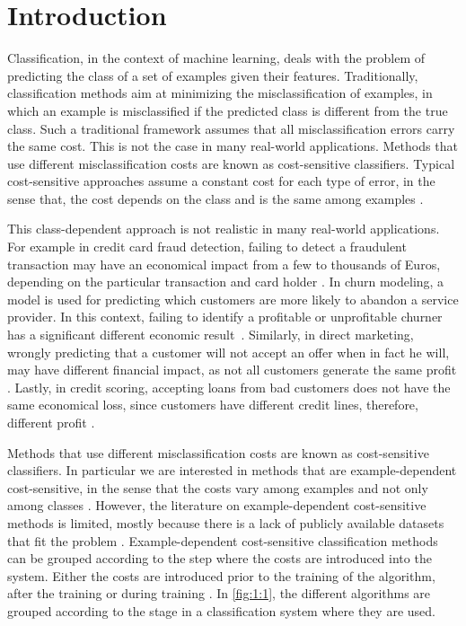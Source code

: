 \chapter{Introduction}

  Classification, in the context of machine learning, deals with the problem of 
  predicting the class of a set of examples given their features. Traditionally, classification 
  methods aim at minimizing the misclassification of examples, in which an example is 
  misclassified if the predicted class is different from the true class. Such a traditional 
  framework assumes that all misclassification errors carry the same cost. This is not the case in 
  many real-world applications. Methods that use different misclassification costs are known as 
  cost-sensitive classifiers. Typical cost-sensitive approaches assume a constant cost for each 
  type of error, in the sense that, the cost depends on the class and is the same among examples 
  \citep{Elkan2001,Kim2012}. 
  
  This class-dependent approach is not realistic in many real-world applications. For 
  example in credit card fraud detection, failing to detect a fraudulent transaction may have an 
  economical impact from a few to thousands of Euros, depending on the particular transaction and 
  card holder \citep{Ngai2011a}. In churn modeling, a model is used for predicting which
  customers are more likely to abandon a service provider. In this context, failing to identify a 
  profitable or unprofitable churner has a significant different economic 
  result~\citep{Verbraken2013}. Similarly, in direct marketing, wrongly predicting that a customer 
  will not accept an offer when in fact he will, may have different financial impact, as not all 
  customers generate the same profit \citep{Zadrozny2003}. Lastly, in credit scoring, accepting 
  loans from bad customers does not have the same economical loss, since customers have different 
  credit lines, therefore, different profit \citep{Verbraken2014}.
  
  Methods that use different misclassification costs are known as cost-sensitive classifiers. In 
  particular we are interested in methods that are example-dependent cost-sensitive, in the sense 
  that the costs vary among examples and not only among classes \citep{Elkan2001}. However, the 
  literature on example-dependent cost-sensitive methods is limited, mostly because there is a 
  lack of publicly available datasets that fit the problem \citep{MacAodha2013}.
  Example-dependent cost-sensitive classification methods can be grouped according to the step 
  where the costs are introduced into the system. Either the costs are introduced prior to the 
  training of the algorithm, after the training or during training \citep{Wang2013}. In 
  \figurename{ \ref{fig:1:1}}, the different algorithms are grouped according to the stage in a 
  classification system where they are used.
  
